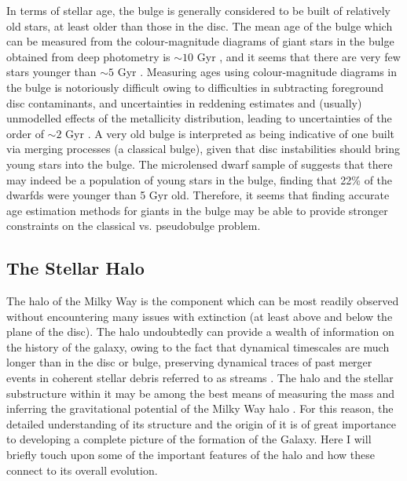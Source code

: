 In terms of stellar age, the bulge is generally considered to be built of relatively old stars, at least older than those in the disc. The mean age of the bulge which can be measured from the colour-magnitude diagrams of giant stars in the bulge obtained from deep photometry is $\sim 10$ Gyr \citep[e.g.][]{2003A&A...399..931Z,2013A&A...559A..98V}, and it seems that there are very few stars younger than $\sim 5$ Gyr \citep{2011ApJ...735...37C}. Measuring ages using colour-magnitude diagrams in the bulge is notoriously difficult owing to difficulties in subtracting foreground disc contaminants, and uncertainties in reddening estimates and (usually) unmodelled effects of the metallicity distribution, leading to uncertainties of the order of $\sim 2$ Gyr \citep{2016ASSL..418..199G}. A very old bulge is interpreted as being indicative of one built via merging processes (a classical bulge), given that disc instabilities should bring young stars into the bulge. The microlensed dwarf sample of \citet{2013A&A...549A.147B} suggests that there may indeed be a population of young stars in the bulge, finding that 22\% of the dwarfds were younger than 5 Gyr old. Therefore, it seems that finding accurate age estimation methods for giants in the bulge may be able to provide stronger constraints on the classical vs. pseudobulge problem.

\subsection{The Stellar Halo}
The halo of the Milky Way is the component which can be most readily observed without encountering many issues with extinction (at least above and below the plane of the disc). The halo undoubtedly can provide a wealth of information on the history of the galaxy, owing to the fact that dynamical timescales are much longer than in the disc or bulge, preserving dynamical traces of past merger events in coherent stellar debris referred to as streams \citep[e.g.][]{1996ApJ...465..278J}. The halo and the stellar substructure within it may be among the best means of measuring the mass and inferring the gravitational potential of the Milky Way halo \citep[e.g.][]{2014ApJ...794....4P}. For this reason, the detailed understanding of its structure and the origin of it is of great importance to developing a complete picture of the formation of the Galaxy. Here I will briefly touch upon some of the important features of the halo and how these connect to its overall evolution.

